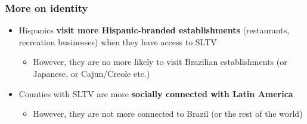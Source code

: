 \documentclass{beamer}
\begin{document}
\begin{frame}
\frametitle{More on identity}\label{identity_more}
\begin{itemize}
  \setlength\itemsep{2em}
\item Hispanics \textbf{visit more Hispanic-branded establishments} (restaurants, recreation businesses) when they have access to SLTV \hyperlink{safegraph_data}{}
\begin{itemize}
\item However, they are no more likely to visit Brazilian establishments (or Japanese, or Cajun/Creole etc.)
\end{itemize}
\item Counties with SLTV are more \textbf{socially connected with Latin America} \hyperlink{sci_data}{}
\begin{itemize}
\item However, they are not more connected to Brazil (or the rest of the world)
\end{itemize}
\end{itemize}
\end{frame}
\end{document}
